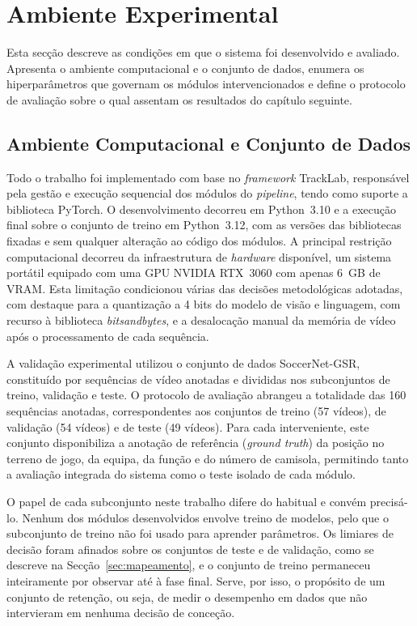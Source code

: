 \FloatBarrier

\section{Ambiente Experimental}

Esta secção descreve as condições em que o sistema foi desenvolvido e avaliado. Apresenta o ambiente
computacional e o conjunto de dados, enumera os hiperparâmetros que governam os módulos
intervencionados e define o protocolo de avaliação sobre o qual assentam os resultados do capítulo
seguinte.

\subsection{Ambiente Computacional e Conjunto de Dados}

Todo o trabalho foi implementado com base no \emph{framework} TrackLab, responsável pela gestão e
execução sequencial dos módulos do \emph{pipeline}, tendo como suporte a biblioteca PyTorch. O
desenvolvimento decorreu em Python~3.10 e a execução final sobre o conjunto de treino em
Python~3.12, com as versões das bibliotecas fixadas e sem qualquer alteração ao código dos módulos.
A principal restrição computacional decorreu da infraestrutura de \emph{hardware}
disponível, um sistema portátil equipado com uma GPU NVIDIA RTX~3060 com apenas 6~GB de VRAM. Esta
limitação condicionou várias das decisões metodológicas adotadas, com destaque para a quantização a
4 bits do modelo de visão e linguagem, com recurso à biblioteca \emph{bitsandbytes}, e a desalocação
manual da memória de vídeo após o processamento de cada sequência.

A validação experimental utilizou o conjunto de dados SoccerNet-GSR, constituído por
sequências de vídeo anotadas e divididas nos subconjuntos de treino, validação e teste.
O protocolo de avaliação abrangeu a totalidade das 160 sequências anotadas,
correspondentes aos conjuntos de treino (57 vídeos), de validação (54 vídeos) e de teste
(49 vídeos). Para cada interveniente, este conjunto disponibiliza a anotação de
referência (\emph{ground truth}) da posição no terreno de jogo, da equipa, da função e do
número de camisola, permitindo tanto a avaliação integrada do sistema como o teste
isolado de cada módulo.

O papel de cada subconjunto neste trabalho difere do habitual e convém precisá-lo. Nenhum dos
módulos desenvolvidos envolve treino de modelos, pelo que o subconjunto de treino não foi usado
para aprender parâmetros. Os limiares de decisão foram afinados sobre os conjuntos de teste e de
validação, como se descreve na Secção~\ref{sec:mapeamento}, e o conjunto de treino permaneceu
inteiramente por observar até à fase final. Serve, por isso, o propósito de um conjunto de
retenção, ou seja, de medir o desempenho em dados que não intervieram em nenhuma decisão de
conceção.

